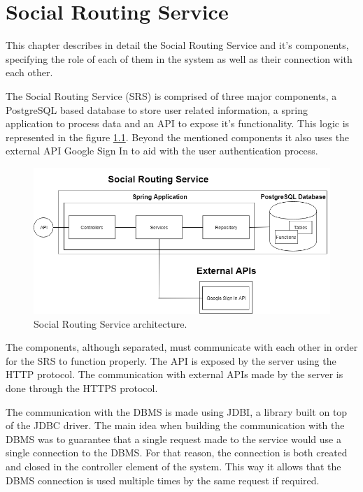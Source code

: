 \chapter{Social Routing Service}

This chapter describes in detail the Social Routing Service and it's components, specifying the role of each of them in the system
as well as their connection with each other.

The Social Routing Service (SRS) is comprised of three major components, 
a PostgreSQL based database to store user related information, a spring application to process data and an API to expose it's functionality.
This logic is represented in the figure \ref{fig:socialroutingservice}. Beyond the mentioned
components it also uses the external API Google Sign In to aid with the user authentication process.

\begin{figure}[ht]            
    \includegraphics[width=\textwidth]{images/project-structure/service-structure2.PNG}
    \caption{Social Routing Service architecture.}
    \label{fig:socialroutingservice}
\end{figure}  

The components, although separated, must communicate with each other in order for the SRS
to function properly. The API is exposed by the server using the HTTP protocol. The 
communication with external APIs made by the server is done through the HTTPS\cite{https} 
protocol.

The communication with the DBMS is made using JDBI\cite{jdbidocs}, a library built on top
of the JDBC\cite{jdbcdocs} driver. The main idea when building the communication with the DBMS
was to guarantee that a single request made to the service would use a single connection 
to the DBMS. For that reason, the connection is both created and closed in the controller
element of the system. This way it allows that the DBMS connection is used multiple times
by the same request if required.
\newpage

